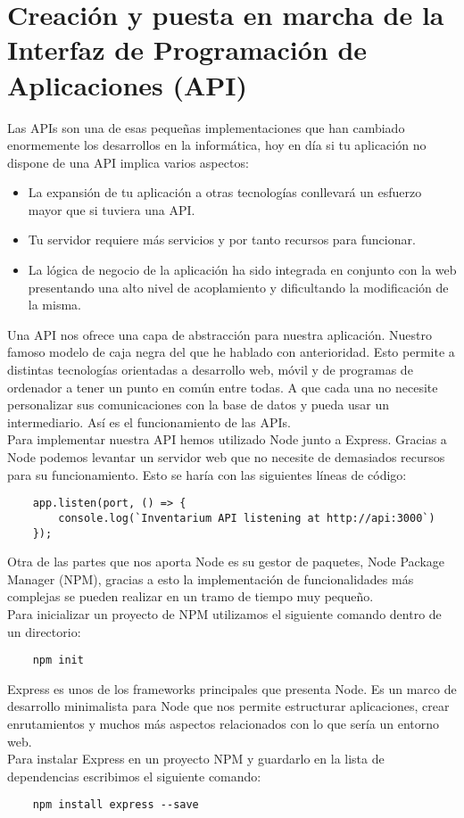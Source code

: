 \section{Creación y puesta en marcha de la Interfaz de Programación de Aplicaciones (API)}
Las APIs son una de esas pequeñas implementaciones que han cambiado enormemente los desarrollos en la informática, hoy en día si tu aplicación no dispone de una API implica varios aspectos:

\begin{itemize}
    \item La expansión de tu aplicación a otras tecnologías conllevará un esfuerzo mayor que si tuviera una API.
    \item Tu servidor requiere más servicios y por tanto recursos para funcionar.
    \item La lógica de negocio de la aplicación ha sido integrada en conjunto con la web presentando una alto nivel de acoplamiento y dificultando la modificación de la misma.
\end{itemize}

Una API nos ofrece una capa de abstracción para nuestra aplicación. Nuestro famoso modelo de caja negra del que he hablado con anterioridad. Esto permite a distintas tecnologías orientadas a desarrollo web, móvil y de programas de ordenador a tener un punto en común entre todas. A que cada una no necesite personalizar sus comunicaciones con la base de datos y pueda usar un intermediario. Así es el funcionamiento de las APIs.
\\Para implementar nuestra API hemos utilizado Node junto a Express. Gracias a Node podemos levantar un servidor web que no necesite de demasiados recursos para su funcionamiento. Esto se haría con las siguientes líneas de código:
\begin{verbatim}
    app.listen(port, () => {
        console.log(`Inventarium API listening at http://api:3000`)
    });
\end{verbatim}
Otra de las partes que nos aporta Node es su gestor de paquetes, Node Package Manager (NPM), gracias a esto la implementación de funcionalidades más complejas se pueden realizar en un tramo de tiempo muy pequeño.
\\Para inicializar un proyecto de NPM utilizamos el siguiente comando dentro de un directorio:
\begin{verbatim}
    npm init
\end{verbatim}

Express es unos de los frameworks principales que presenta Node. Es un marco de desarrollo minimalista para Node que nos permite estructurar aplicaciones, crear enrutamientos y muchos más aspectos relacionados con lo que sería un entorno web.
\\Para instalar Express en un proyecto NPM y guardarlo en la lista de dependencias escribimos el siguiente comando:
\begin{verbatim}
    npm install express --save
\end{verbatim}

